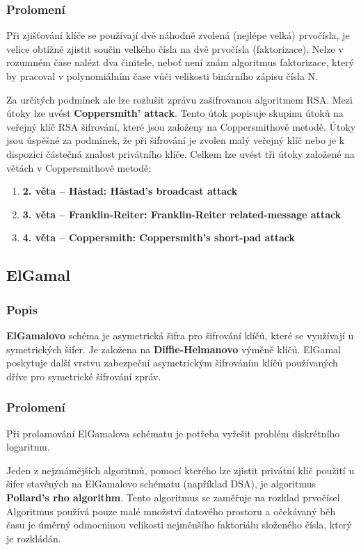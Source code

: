 \documentclass[12pt, a4paper]{article}
\begin{document}
		\subsubsection{Prolomení}
		Při zjišťování klíče se používají dvě náhodně zvolená (nejlépe velká) prvočísla, je velice obtížné zjistit součin velkého čísla na dvě prvočísla (faktorizace). Nelze v rozumném čase nalézt dva činitele, neboť není znám algoritmus faktorizace, který by pracoval v polynomiálním čase vůči velikosti binárního zápisu čísla N.
		\par
		Za určitých podmínek ale lze rozlušit zprávu zašifrovanou algoritmem RSA. Mezi útoky lze uvést \textbf{Coppersmith' attack}. Tento útok popisuje skupinu útoků na veřejný klíč RSA šifrování, které jsou založeny na Coppersmithově metodě. Útoky jsou úspěšné za podmínek, že při šifrování je zvolen malý veřejný klíč nebo je k dispozici částečná znalost privátního klíče. Celkem lze uvést tři útoky založené na větách v Coppersmithově metodě: 
	\begin{enumerate}
	\item \textbf{2. věta -- Håstad: Håstad's broadcast attack} 
	\item \textbf{3. věta -- Franklin-Reiter: Franklin-Reiter related-message attack}
	\item \textbf{4. věta -- Coppersmith: Coppersmith’s short-pad attack}
	\end{enumerate}
	\subsection{ElGamal}
	\label{subsec:elgamal}
		\subsubsection{Popis}
		\textbf{ElGamalovo} schéma je asymetrická šifra pro šifrování klíčů, které se využívají u symetrických šifer. Je založena na \textbf{Diffie-Helmanovo} výměně klíčů. ElGamal poskytuje další vrstvu zabezpeční asymetrickým šifrováním klíčů používaných dříve pro symetrické šifrování zpráv. 
		\subsubsection{Prolomení}
		Při prolamování ElGamalova schématu je potřeba vyřešit problém diskrétního logaritmu.
		\par
		Jeden z nejznámějších algoritmů, pomocí kterého lze zjistit privátní klíč použití u šifer stavěných na ElGamalovo schématu (například DSA), je algoritmus \textbf{Pollard's rho algorithm}. Tento algoritmus se zaměřuje na rozklad prvočísel. Algoritmus používá pouze malé množství datového prostoru a očekávaný běh času je úměrný odmocninou velikosti nejměnšího faktoriálu složeného čísla, který je rozkládán.
\end{document}
